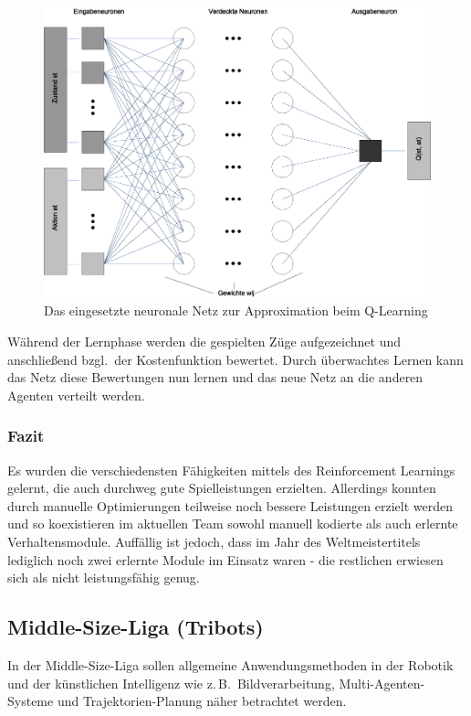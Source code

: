 \begin{figure}
  \centering
  \includegraphics[width=1.00\textwidth]{../images/rl-neuronales-netz}
  \caption{Das eingesetzte neuronale Netz zur Approximation beim Q-Learning}
  \label{fig:rl-neuronales-netz}
\end{figure}

Während der Lernphase werden die gespielten Züge aufgezeichnet und anschließend
bzgl.\ der Kostenfunktion bewertet. Durch überwachtes Lernen kann das Netz diese
Bewertungen nun lernen und das neue Netz an die anderen Agenten verteilt werden.

\subsubsection{Fazit}
Es wurden die verschiedensten Fähigkeiten mittels des Reinforcement Learnings 
gelernt, die auch durchweg gute Spielleistungen erzielten. Allerdings konnten 
durch manuelle Optimierungen teilweise noch bessere Leistungen erzielt werden 
und so koexistieren im aktuellen Team sowohl manuell kodierte als auch erlernte 
Verhaltensmodule. Auffällig ist jedoch, dass im Jahr des Weltmeistertitels 
lediglich noch zwei erlernte Module im Einsatz waren - die restlichen erwiesen 
sich als nicht leistungsfähig genug.

\subsection{Middle-Size-Liga (Tribots)}
In der Middle-Size-Liga sollen allgemeine Anwendungsmethoden in der Robotik und 
der künstlichen Intelligenz wie z.\,B.\ Bildverarbeitung, Multi-Agenten-Systeme 
und Tra\-jek\-to\-ri\-en-Planung näher betrachtet werden.

